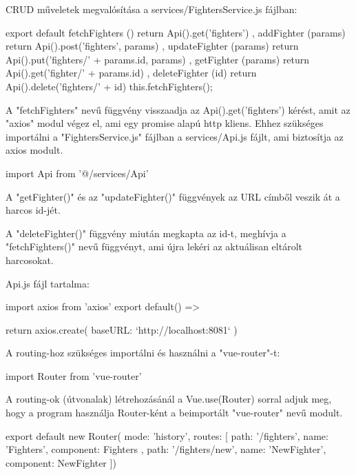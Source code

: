 
CRUD műveletek megvalósítása a services/FightersService.js fájlban:

\begin{cpp}
export default {
  fetchFighters () {
    return Api().get('fighters')
  }, 
  addFighter (params) {
    return Api().post('fighters', params)
  },
  updateFighter (params) {
    return Api().put('fighters/' + params.id, params)
  },
  getFighter (params) {
    return Api().get('fighter/' + params.id)
  },
  deleteFighter (id) {
    return Api().delete('fighters/' + id)
    this.fetchFighters();
  }
}
\end{cpp}

A "fetchFighters" nevű függvény visszaadja az Api().get(’fighters’) kérést, amit az "axios" modul végez el, ami egy promise alapú http kliens. Ehhez szükséges importálni a "FightersService.js" fájlban a services/Api.js fájlt, ami biztosítja az axios modult.

\begin{cpp}
import Api from '@/services/Api'
\end{cpp}

A "getFighter()" és az "updateFighter()" függvények az URL címből veszik át a harcos id-jét.

A "deleteFighter()" függvény miután megkapta az id-t, meghívja a "fetchFighters()" nevű függvényt, ami újra lekéri az aktuálisan eltárolt harcosokat.

Api.js fájl tartalma:

\begin{cpp}
import axios from 'axios'
export default() => {

  return axios.create({
    baseURL: `http://localhost:8081`
  })
}
\end{cpp}


A routing-hoz szükséges importálni és használni a "vue-router"-t:

\begin{cpp}
import Router from 'vue-router'
\end{cpp}

A routing-ok (útvonalak) létrehozásánál a Vue.use(Router) sorral adjuk meg, hogy a program használja Router-ként a beimportált "vue-router" nevű modult.

\begin{cpp}
export default new Router({
mode: 'history',
  routes: [
{
      path: '/fighters',
      name: 'Fighters',
      component: Fighters
  },
  {
      path: '/fighters/new',
      name: 'NewFighter',
      component: NewFighter  }]})
\end{cpp}

